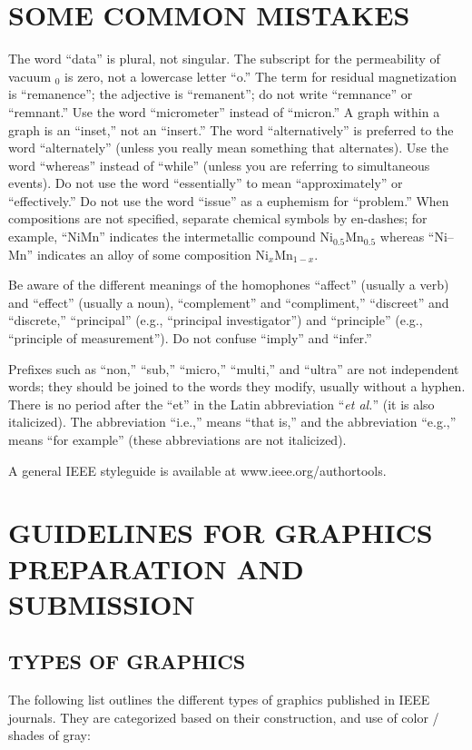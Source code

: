\documentclass{IEEEoj-data}
\begin{document}
{\section*{SOME COMMON MISTAKES}
The word ``data'' is plural, not singular. The subscript for the 
permeability of vacuum \textmu $_{0}$ is zero, not a lowercase letter ``o.'' 
The term for residual magnetization is ``remanence''; the adjective is 
``remanent''; do not write ``remnance'' or ``remnant.'' Use the word 
``micrometer'' instead of ``micron.'' A graph within a graph is an 
``inset,'' not an ``insert.'' The word ``alternatively'' is preferred to the 
word ``alternately'' (unless you really mean something that alternates). Use 
the word ``whereas'' instead of ``while'' (unless you are referring to 
simultaneous events). Do not use the word ``essentially'' to mean 
``approximately'' or ``effectively.'' Do not use the word ``issue'' as a 
euphemism for ``problem.'' When compositions are not specified, separate 
chemical symbols by en-dashes; for example, ``NiMn'' indicates the 
intermetallic compound Ni$_{0.5}$Mn$_{0.5}$ whereas ``Ni--Mn'' indicates an 
alloy of some composition Ni$_{x}$Mn$_{1-x}$.

Be aware of the different meanings of the homophones ``affect'' (usually a 
verb) and ``effect'' (usually a noun), ``complement'' and ``compliment,'' 
``discreet'' and ``discrete,'' 
``principal'' (e.g., ``principal investigator'') and ``principle'' 
(e.g., ``principle of measurement''). Do not confuse ``imply'' and 
``infer.'' 

Prefixes such as ``non,'' ``sub,'' ``micro,'' ``multi,'' and ``ultra'' are 
not independent words; they should be joined to the words they modify, 
usually without a hyphen. There is no period after the ``et'' in the Latin 
abbreviation ``\textit{et al.}'' (it is also italicized). The abbreviation ``i.e.,'' means 
``that is,'' and the abbreviation ``e.g.,'' means ``for example'' (these 
abbreviations are not italicized).

A general IEEE styleguide is available at www.ieee.org/\break authortools.

\section*{GUIDELINES FOR GRAPHICS PREPARATION 
AND SUBMISSION}
\subsection*{TYPES OF GRAPHICS}
The following list outlines the different types of graphics published in 
IEEE journals. They are categorized based on their construction, and use of 
color / shades of gray:

}
\end{document}
